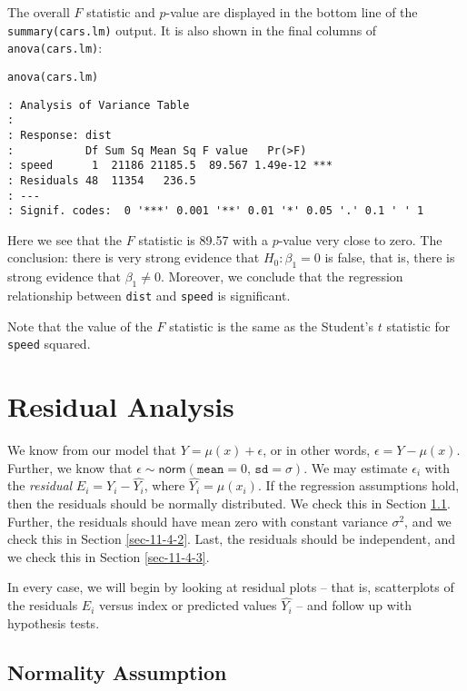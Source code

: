 The overall \(F\) statistic and \(p\)-value are displayed in the
bottom line of the \texttt{summary(cars.lm)} output. It is also shown in the
final columns of \texttt{anova(cars.lm)}:

\begin{verbatim}
anova(cars.lm)
\end{verbatim}

\begin{verbatim}
: Analysis of Variance Table
: 
: Response: dist
:           Df Sum Sq Mean Sq F value   Pr(>F)    
: speed      1  21186 21185.5  89.567 1.49e-12 ***
: Residuals 48  11354   236.5                     
: ---
: Signif. codes:  0 '***' 0.001 '**' 0.01 '*' 0.05 '.' 0.1 ' ' 1
\end{verbatim}

Here we see that the \(F\) statistic is 89.57 with a
\(p\)-value very close to zero. The conclusion: there is very strong
evidence that \(H_{0}:\beta_{1} = 0 \) is false, that is, there is
strong evidence that \( \beta_{1} \neq 0 \). Moreover, we conclude
that the regression relationship between \texttt{dist} and \texttt{speed} is
significant.

Note that the value of the \(F\) statistic is the same as the
Student's \(t\) statistic for \texttt{speed} squared.

\section{Residual Analysis}
\label{sec-11-4}

We know from our model that \(Y=\mu(x)+\epsilon\), or in other words,
\(\epsilon=Y-\mu(x)\). Further, we know that
\(\epsilon\sim\mathsf{norm}(\mathtt{mean}=0,\,\mathtt{sd}=\sigma)\). We
may estimate \(\epsilon_{i}\) with the \emph{residual}
\(E_{i}=Y_{i}-\hat{Y_{i}}\), where
\(\hat{Y_{i}}=\hat{\mu}(x_{i})\). If the regression assumptions hold,
then the residuals should be normally distributed. We check this in
Section \ref{sec-11-4-1}. Further, the residuals should have mean
zero with constant variance \(\sigma^{2}\), and we check this in
Section \ref{sec-11-4-2}. Last, the residuals should be
independent, and we check this in Section \ref{sec-11-4-3}.

In every case, we will begin by looking at residual plots -- that is,
scatterplots of the residuals \(E_{i}\) versus index or predicted
values \(\hat{Y_{i}}\) -- and follow up with hypothesis tests.

\subsection{Normality Assumption}
\label{sec-11-4-1}

